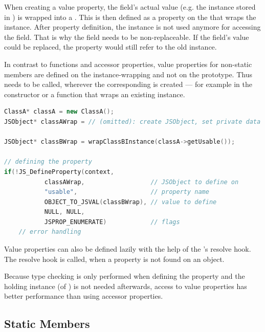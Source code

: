 When creating a value property, the field's actual value (e.g. the  instance stored in ) is wrapped into a . This is then defined as a property on the  that wraps the  instance. After property definition, the  instance is not used anymore for accessing the field. That is why the field needs to be non-replaceable. If the field's value could be replaced, the  property would still refer to the old instance.

In contrast to functions and accessor properties, value properties for non-static members are defined on the instance-wrapping  and not on the prototype. Thus \linebreak{} needs to be called, wherever the corresponding  is \linebreak created --- for example in the constructor or a function that wraps an existing instance.

\SingleSpacing
\begin{lstlisting}[language=C++, caption=Defining a value property]
ClassA* classA = new ClassA();
JSObject* classAWrap = // (omitted): create JSObject, set private data

JSObject* classBWrap = wrapClassBInstance(classA->getUsable());

// defining the property
if(!JS_DefineProperty(context, 
           classAWrap,                  // JSObject to define on
           "usable",                    // property name
           OBJECT_TO_JSVAL(classBWrap), // value to define
           NULL, NULL,
           JSPROP_ENUMERATE)            // flags
	// error handling
\end{lstlisting}
\OnehalfSpacing

Value properties can also be defined lazily with the help of the 's resolve hook. The resolve hook is called, when a property is not found on an object.

Because type checking is only performed when defining the property and the holding instance (of ) is not needed afterwards, access to value properties has better performance than using accessor properties.

\subsection{Static Members}

